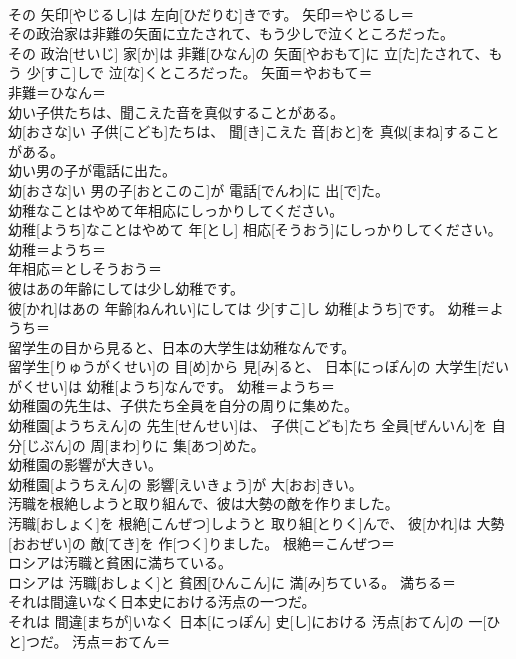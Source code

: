 \documentclass[8pt]{extreport}
\begin{document}
\begin{CJK}{UTF8}{min}
\\	その 矢印[やじるし]は 左向[ひだりむ]きです。	矢印＝やじるし＝ 
\\	その政治家は非難の矢面に立たされて、もう少しで泣くところだった。	
\\	その 政治[せいじ] 家[か]は 非難[ひなん]の 矢面[やおもて]に 立[た]たされて、もう 少[すこ]しで 泣[な]くところだった。	矢面＝やおもて＝ 
\\	非難＝ひなん＝ 
\\	幼い子供たちは、聞こえた音を真似することがある。	
\\	幼[おさな]い 子供[こども]たちは、 聞[き]こえた 音[おと]を 真似[まね]することがある。	
\\	幼い男の子が電話に出た。	
\\	幼[おさな]い 男の子[おとこのこ]が 電話[でんわ]に 出[で]た。	
\\	幼稚なことはやめて年相応にしっかりしてください。	
\\	幼稚[ようち]なことはやめて 年[とし] 相応[そうおう]にしっかりしてください。	幼稚＝ようち＝ 
\\	年相応＝としそうおう＝ 
\\	彼はあの年齢にしては少し幼稚です。	
\\	彼[かれ]はあの 年齢[ねんれい]にしては 少[すこ]し 幼稚[ようち]です。	幼稚＝ようち＝ 
\\	留学生の目から見ると、日本の大学生は幼稚なんです。	
\\	留学生[りゅうがくせい]の 目[め]から 見[み]ると、 日本[にっぽん]の 大学生[だいがくせい]は 幼稚[ようち]なんです。	幼稚＝ようち＝ 
\\	幼稚園の先生は、子供たち全員を自分の周りに集めた。	
\\	幼稚園[ようちえん]の 先生[せんせい]は、 子供[こども]たち 全員[ぜんいん]を 自分[じぶん]の 周[まわ]りに 集[あつ]めた。	
\\	幼稚園の影響が大きい。	
\\	幼稚園[ようちえん]の 影響[えいきょう]が 大[おお]きい。	
\\	汚職を根絶しようと取り組んで、彼は大勢の敵を作りました。	
\\	汚職[おしょく]を 根絶[こんぜつ]しようと 取り組[とりく]んで、 彼[かれ]は 大勢[おおぜい]の 敵[てき]を 作[つく]りました。	根絶＝こんぜつ＝ 
\\	ロシアは汚職と貧困に満ちている。	
\\	ロシアは 汚職[おしょく]と 貧困[ひんこん]に 満[み]ちている。	満ちる＝ 
\\	それは間違いなく日本史における汚点の一つだ。	
\\	それは 間違[まちが]いなく 日本[にっぽん] 史[し]における 汚点[おてん]の 一[ひと]つだ。	汚点＝おてん＝ 

\end{CJK}
\end{document}
